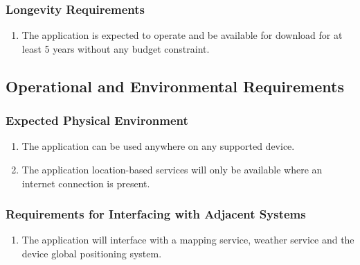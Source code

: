 \documentclass[titlepage]{article}
\newcounter{myCounter}
\begin{document}
\subsubsection{Longevity Requirements}
\label{ssub:longevity_requirements}
\begin{enumerate}[{PR}1. ]
    \setcounter{enumi}{\themyCounter}
    \item The application is expected to operate and be available for download for at least 5 years
    without any budget constraint.
    \setcounter{myCounter}{\theenumi}
\end{enumerate}


\subsection{Operational and Environmental Requirements}
\label{sub:operational_and_environmental_requirements}
\setcounter{myCounter}{0}

\subsubsection{Expected Physical Environment}
\label{ssub:expected_physical_environment}
\begin{enumerate}[{OE}1. ]
    \setcounter{enumi}{\themyCounter}
    \item The application can be used anywhere on any supported device.
    \item The application location-based services will only be available where an internet
    connection is present.
    \setcounter{myCounter}{\theenumi}
\end{enumerate}

\subsubsection{Requirements for Interfacing with Adjacent Systems}
\label{ssub:requirements_for_interfacing_with_adjacent_systems}
\begin{enumerate}[{OE}1. ]
    \setcounter{enumi}{\themyCounter}
    \item The application will interface with a mapping service, weather service and the device
    global positioning system.
    \setcounter{myCounter}{\theenumi}
\end{enumerate}
\end{document}
